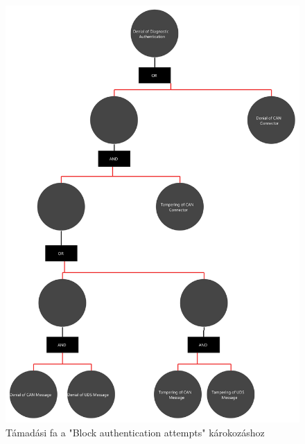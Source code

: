 \begin{figure}[!ht]
	\centering
	\includegraphics[width=120mm, keepaspectratio]{figures/AT-SECDIAG-02.png}
	\caption{Támadási fa a "Block authentication attempts" károkozáshoz} 
\end{figure}
